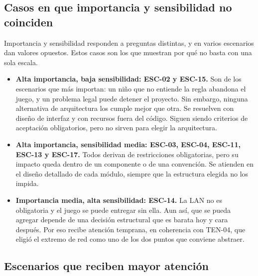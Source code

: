\subsection{Casos en que importancia y sensibilidad no coinciden}

Importancia y sensibilidad responden a preguntas distintas, y en varios escenarios dan valores opuestos. Estos casos son los que muestran por qué no basta con una sola escala.

\begin{itemize}
  \item \textbf{Alta importancia, baja sensibilidad: ESC-02 y ESC-15.} Son de los escenarios que más importan: un niño que no entiende la regla abandona el juego, y un problema legal puede detener el proyecto. Sin embargo, ninguna alternativa de arquitectura los cumple mejor que otra. Se resuelven con diseño de interfaz y con recursos fuera del código. Siguen siendo criterios de aceptación obligatorios, pero no sirven para elegir la arquitectura.
  \item \textbf{Alta importancia, sensibilidad media: ESC-03, ESC-04, ESC-11, ESC-13 y ESC-17.} Todos derivan de restricciones obligatorias, pero su impacto queda dentro de un componente o de una convención. Se atienden en el diseño detallado de cada módulo, siempre que la estructura elegida no los impida.
  \item \textbf{Importancia media, alta sensibilidad: ESC-14.} La LAN no es obligatoria y el juego se puede entregar sin ella. Aun así, que se pueda agregar depende de una decisión estructural que es barata hoy y cara después. Por eso recibe atención temprana, en coherencia con TEN-04, que eligió el extremo de red como uno de los dos puntos que conviene abstraer.
\end{itemize}

\subsection{Escenarios que reciben mayor atención}


